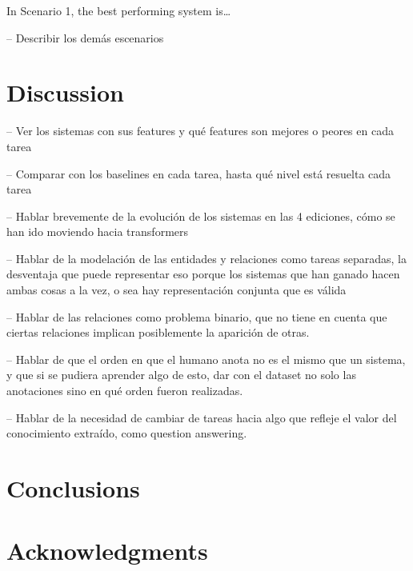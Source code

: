\documentclass[a4paper,11pt,twocolumn,twoside]{article}
\begin{document}
In Scenario 1, the best performing system is\dots

-- Describir los demás escenarios

\section{Discussion}\label{sec:discussion}

-- Ver los sistemas con sus features y qué features son mejores o peores en cada tarea

-- Comparar con los baselines en cada tarea, hasta qué nivel está resuelta cada tarea

-- Hablar brevemente de la evolución de los sistemas en las 4 ediciones,
cómo se han ido moviendo hacia transformers

-- Hablar de la modelación de las entidades y relaciones como tareas separadas,
la desventaja que puede representar eso porque los sistemas que han ganado hacen
ambas cosas a la vez, o sea hay representación conjunta que es válida

-- Hablar de las relaciones como problema binario, que no tiene en cuenta que ciertas
relaciones implican posiblemente la aparición de otras.

-- Hablar de que el orden en que el humano anota no es el mismo que un sistema,
y que si se pudiera aprender algo de esto, dar con el dataset no solo las anotaciones
sino en qué orden fueron realizadas.

-- Hablar de la necesidad de cambiar de tareas hacia algo que refleje el valor
del conocimiento extraído, como question answering.

\section{Conclusions}\label{sec:conclusions}

\section*{Acknowledgments}



\end{document}
